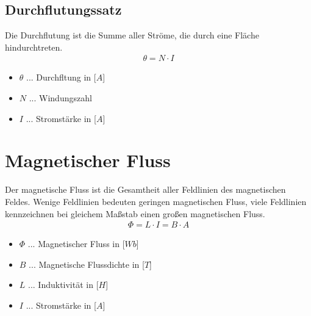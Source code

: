\subsection{Durchflutungssatz}
Die Durchflutung ist die Summe aller Ströme, die durch eine Fläche hindurchtreten.
\begin{align}
    \theta = N \cdot I
\end{align}

\begin{itemize}
    \item $\theta$ ... Durchfltung in [$A$]
    \item $N$ ... Windungszahl
    \item $I$ ... Stromstärke in [$A$]
\end{itemize}

\newpage

\section{Magnetischer Fluss}
Der magnetische Fluss ist die Gesamtheit aller Feldlinien des magnetischen Feldes. Wenige Feldlinien bedeuten geringen magnetischen Fluss, viele Feldlinien kennzeichnen bei gleichem Maßstab einen großen magnetischen Fluss.
\begin{align}
    \Phi = L \cdot I = B \cdot A
\end{align}
\begin{itemize}
    \item $\Phi$ ... Magnetischer Fluss in [$Wb$]
    \item $B$ ... Magnetische Flussdichte in [$T$]
    \item $L$ ... Induktivität in [$H$]
    \item $I$ ... Stromstärke in [$A$]
\end{itemize}